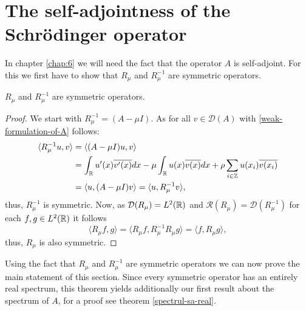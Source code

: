 \section{The self-adjointness of the Schrödinger operator}

In chapter \ref{chap:6} we will need the fact that the operator $A$ is self-adjoint. For this we first have to show that $R_{\mu}$ and $R_{\mu}^{-1}$ are symmetric operators.

\begin{theorem} \label{2.2:thm-RmuSymmetric}
	$R_{\mu}$ and $R_{\mu}^{-1}$ are symmetric operators.
	
	\begin{proof}
		We start with $R_{\mu}^{-1} = (A - \mu I)$. As for all $v \in \mathcal{D}(A)$ with \eqref{weak-formulation-of-A} follows:
			\begin{align*}
				\langle R_{\mu}^{-1} u, v \rangle & = \langle (A - \mu I) u, v \rangle \\
					& = \int_{\mathbb{R}} u'(x) \overline{v'(x)} dx -  \mu \int_{\mathbb{R}} u(x) \overline{v(x)} dx + \rho \sum_{i \in \mathbb{Z}} u(x_{i}) \overline{v(x_{i})} \\
					& = \langle u, (A - \mu I) v \rangle = \langle u,  R_{\mu}^{-1} v \rangle,
			\end{align*}
		thus, $R_{\mu}^{-1}$ is symmetric. Now, as $\mathcal{D}(R_{\mu}) = L^{2}(\mathbb{R})$ and $\mathcal{R}(R_{\mu}) = \mathcal{D}(R_{\mu}^{-1})$ for each $f, g \in L^{2}(\mathbb{R})$ it follows
		\[  \langle R_{\mu} f, g \rangle =  \langle R_{\mu} f, R_{\mu}^{-1} R_{\mu} g \rangle = \langle f, R_{\mu} g \rangle, \]
		thus, $R_{\mu}$ is also symmetric.
	\end{proof}
\end{theorem}

Using the fact that $R_{\mu}$ and $R_{\mu}^{-1}$ are symmetric operators we can now prove the main statement of this section. Since every symmetric operator has an entirely real spectrum, this theorem yields additionally our first result about the spectrum of $A$, for a proof see theorem \ref{spectrul-sa-real}.

